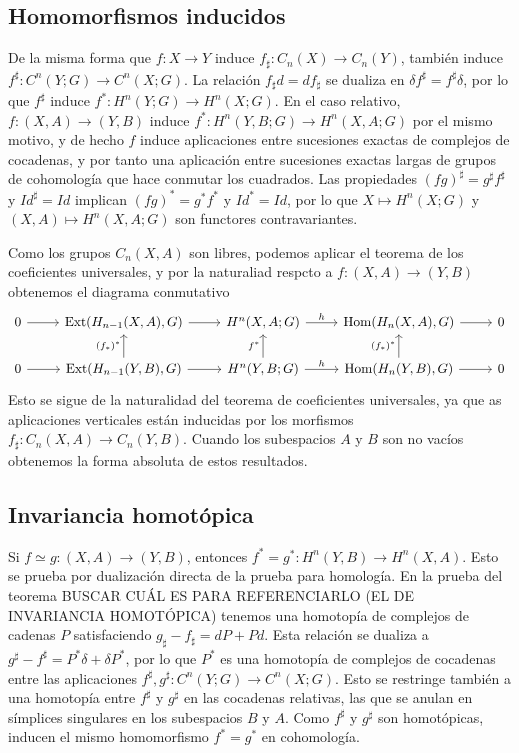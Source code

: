 \documentclass[TA.tex]{subfiles}
\begin{document}
\subsection{Homomorfismos inducidos}

De la misma forma que $f:X\to Y$ induce $f_\sharp:C_n(X)\to C_n(Y)$, también induce $f^\sharp:C^n(Y;G)\to C^n(X;G)$. La relación $f_\sharp d=d f_\sharp$ se dualiza en $\delta f^\sharp=f^\sharp \delta$, por lo que $f^\sharp$ induce $f^*:H^n(Y;G)\to H^n(X;G)$. En el caso relativo, $f:(X,A)\to (Y,B)$ induce $f^*:H^n(Y,B;G)\to H^n(X,A;G)$ por el mismo motivo, y de hecho $f$ induce aplicaciones entre sucesiones exactas de complejos de cocadenas, y por tanto una aplicación entre sucesiones exactas largas de grupos de cohomología que hace conmutar los cuadrados. Las propiedades $(fg)^\sharp=g^\sharp f^\sharp$ y $Id^\sharp=Id$ implican $(fg)^*=g^*f^*$ y $Id^*=Id$, por lo que $X\mapsto H^n(X;G)$ y $(X,A)\mapsto H^n(X,A;G)$ son functores contravariantes. 

Como los grupos $C_n(X,A)$ son libres, podemos aplicar el teorema de los coeficientes universales, y por la naturaliad respcto a $f:(X,A)\to (Y,B)$ obtenemos el diagrama conmutativo
\[
\begin{tikzcd}
0\arrow[r] & \Ext(H_{n-1}(X,A),G)\arrow[r] & H^n(X,A;G)\arrow[r, "h"] & \Hom(H_n(X,A),G)\arrow[r] & 0\\
0\arrow[r] & \Ext(H_{n-1}(Y,B),G)\arrow[r]\arrow[u, "(f_*)^*"] & H^n(Y,B;G)\arrow[r, "h"]\arrow[u, "f^*"] & \Hom(H_n(Y,B),G)\arrow[r]\arrow[u, "(f_*)^*"]& 0
\end{tikzcd}
\]
Esto se sigue de la naturalidad del teorema de coeficientes universales, ya que as aplicaciones verticales están inducidas por los morfismos $f_\sharp:C_n(X,A)\to C_n(Y,B)$. Cuando los subespacios $A$ y $B$ son no vacíos obtenemos la forma absoluta de estos resultados. 

\subsection{Invariancia homotópica}
Si $f\simeq g:(X,A)\to (Y,B)$, entonces $f^*=g^*:H^n(Y,B)\to H^n(X,A)$. Esto se prueba por dualización directa de la prueba para homología. En la prueba del teorema BUSCAR CUÁL ES PARA REFERENCIARLO (EL DE INVARIANCIA HOMOTÓPICA) tenemos una homotopía de complejos de cadenas $P$ satisfaciendo $g_\sharp-f_\sharp=dP+Pd$. Esta relación se dualiza a $g^\sharp-f^\sharp=P^*\delta+\delta P^*$, por lo que $P^*$ es una homotopía de complejos de cocadenas entre las aplicaciones $f^\sharp, g^\sharp: C^n(Y;G)\to C^n(X;G)$. Esto se restringe también a una homotopía entre $f^\sharp$ y $g^\sharp$ en las cocadenas relativas, las que se anulan en símplices singulares en los subespacios $B$ y $A$. Como $f^\sharp$ y $g^\sharp$ son homotópicas, inducen el mismo homomorfismo $f^*=g^*$ en cohomología.
\end{document}
